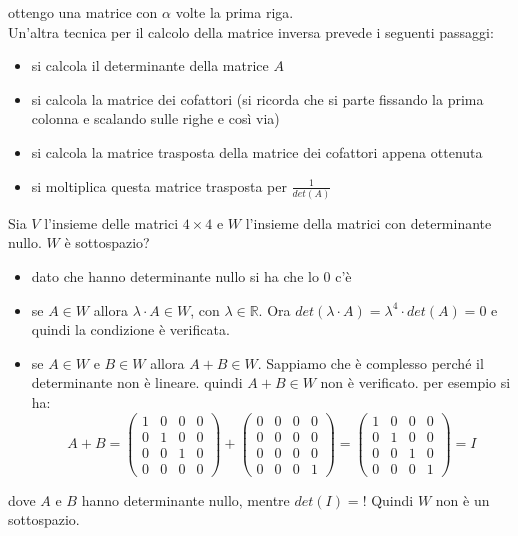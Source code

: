 \documentclass[a4paper,12pt, oneside]{book}
\begin{document}
ottengo una matrice con $\alpha$ volte la prima riga.\\
Un'altra tecnica per il calcolo della matrice inversa prevede i seguenti passaggi:
\begin{itemize}
	\item si calcola il determinante della matrice $A$
	\item si calcola la matrice dei cofattori (si ricorda che si parte fissando la prima colonna e scalando sulle righe e così via)
	\item si calcola la matrice trasposta della matrice dei cofattori appena ottenuta
	\item si moltiplica questa matrice trasposta per $\frac{1}{det(A)}$
\end{itemize}
\newpage
\begin{esercizio}
	Sia $V$ l'insieme delle matrici $4\times 4$ e $W$ l'insieme della matrici con determinante nullo. $W$ è sottospazio?
	\begin{itemize}
		\item dato che hanno determinante nullo si ha che lo 0 c'è
		\item se $A\in W$ allora $\lambda\cdot A\in W$, con $\lambda\in \mathbb{R}$. Ora $det(\lambda\cdot A)=\lambda^4 \cdot det(A)=0$ e quindi la condizione è verificata.
		\item se $A\in W$ e $B\in W$ allora $A+B\in W$. Sappiamo che è complesso perché il determinante non è lineare. quindi $A+B\in W$ non è verificato. per esempio si ha:
		      $$
			      A+B=
			      \left(\begin{matrix}
				      1 & 0 & 0 & 0 \\
				      0 & 1 & 0 & 0 \\
				      0 & 0 & 1 & 0 \\
				      0 & 0 & 0 & 0
			      \end{matrix}\right)+\left(\begin{matrix}
				      0 & 0 & 0 & 0 \\
				      0 & 0 & 0 & 0 \\
				      0 & 0 & 0 & 0 \\
				      0 & 0 & 0 & 1
			      \end{matrix}\right)=\left(\begin{matrix}
				      1 & 0 & 0 & 0 \\
				      0 & 1 & 0 & 0 \\
				      0 & 0 & 1 & 0 \\
				      0 & 0 & 0 & 1
			      \end{matrix}\right)=I
		      $$
	\end{itemize}
	dove $A$ e $B$ hanno determinante nullo, mentre $det(I)=!$
	Quindi $W$ non è un sottospazio.
\end{esercizio}
\end{document}
